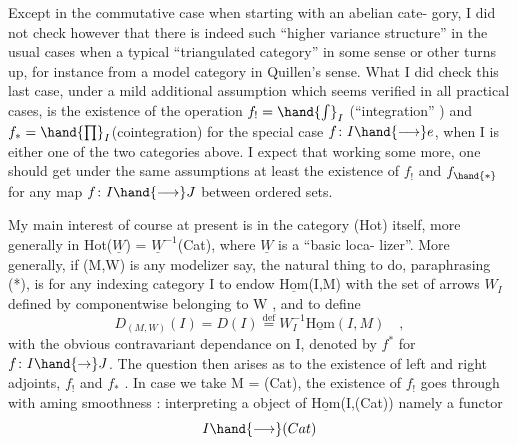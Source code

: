 Except in the commutative case when starting with an abelian cate-%
gory, I did not check however that  there is indeed such ``higher
variance structure'' in the usual cases\hand{,} when a typical ``triangulated
category'' in some sense or other turns up,  for instance from a model
category in Quillen's sense.  What I did check  this last case,  under
a mild additional assumption which seems verified in all practical cases,
is the existence of the operation  $f_! = \hand{\int}_I$  (``integration'' ) and
$f_* = \hand{\prod}_I$(cointegration) for the special case $f\colon I \hand{\longrightarrow} e$,  when I is either
one of the two categories\inserted{(**)} above.  I expect that working some more,  one
should get under the same assumptions  at least the existence of
$f_!$ and $f_{\hand{*}}$  for any map $f\colon I \hand{\longrightarrow} J$ between ordered sets.

My main interest of course at present is in the category (Hot)
itself,  more generally in Hot($\underline{W}$) = $\underline{W}^{-1}$(Cat),  where $\underline{W}$ is a ``basic loca-%
lizer''.  More generally,  if (M,W)  is any modelizer say,  the natural
thing to do,  paraphrasing (*),  is for any indexing category I to
endow  $\underline{\mathrm{Hom}}$(I,M)  with the set of arrows $W_I$  defined by componentwise
belonging to W ,  and to define
\[ D_{(M,W)}(I) = D(I) \overset{\mathrm{def}}{=} W_I^{-1}\underline{\mathrm{Hom}}(I,M) \quad , \]
with the obvious contravariant dependance on I,  denoted by $f^*$  for
$f\colon I \hand{\rightarrow} J$.  The question  then arises as to the existence of left and
right adjoints,  $f_!$  and $f_*$ .  In case we take M = (Cat),  the existence
of  $f_!$  goes through with aming smoothness :  interpreting a object
of  $\underline{\mathrm{Hom}}$(I,(Cat))   namely a functor
\[ I \hand{\longrightarrow} (Cat) \]

